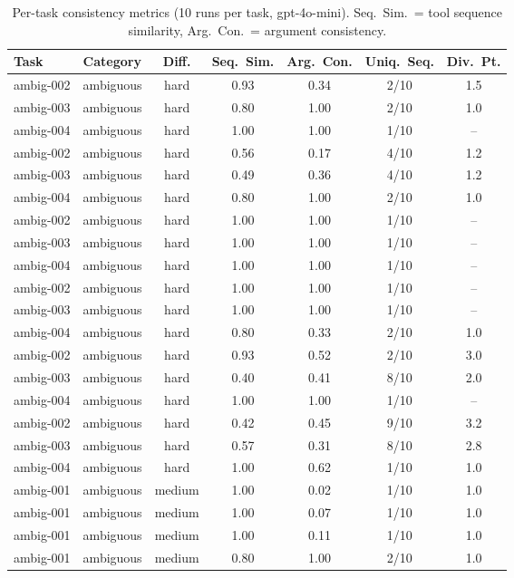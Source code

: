 \begin{table}[t]
\centering
\caption{Per-task consistency metrics (10 runs per task, gpt-4o-mini). Seq.\ Sim.\ = tool sequence similarity, Arg.\ Con.\ = argument consistency.}
\label{tab:results}
\small
\begin{tabular}{llccccc}
\toprule
Task & Category & Diff. & Seq.\ Sim. & Arg.\ Con. & Uniq.\ Seq. & Div.\ Pt. \\
\midrule
ambig-002 & ambiguous & hard & 0.93 & 0.34 & 2/10 & 1.5 \\
ambig-003 & ambiguous & hard & 0.80 & 1.00 & 2/10 & 1.0 \\
ambig-004 & ambiguous & hard & 1.00 & 1.00 & 1/10 & -- \\
ambig-002 & ambiguous & hard & 0.56 & 0.17 & 4/10 & 1.2 \\
ambig-003 & ambiguous & hard & 0.49 & 0.36 & 4/10 & 1.2 \\
ambig-004 & ambiguous & hard & 0.80 & 1.00 & 2/10 & 1.0 \\
ambig-002 & ambiguous & hard & 1.00 & 1.00 & 1/10 & -- \\
ambig-003 & ambiguous & hard & 1.00 & 1.00 & 1/10 & -- \\
ambig-004 & ambiguous & hard & 1.00 & 1.00 & 1/10 & -- \\
ambig-002 & ambiguous & hard & 1.00 & 1.00 & 1/10 & -- \\
ambig-003 & ambiguous & hard & 1.00 & 1.00 & 1/10 & -- \\
ambig-004 & ambiguous & hard & 0.80 & 0.33 & 2/10 & 1.0 \\
ambig-002 & ambiguous & hard & 0.93 & 0.52 & 2/10 & 3.0 \\
ambig-003 & ambiguous & hard & 0.40 & 0.41 & 8/10 & 2.0 \\
ambig-004 & ambiguous & hard & 1.00 & 1.00 & 1/10 & -- \\
ambig-002 & ambiguous & hard & 0.42 & 0.45 & 9/10 & 3.2 \\
ambig-003 & ambiguous & hard & 0.57 & 0.31 & 8/10 & 2.8 \\
ambig-004 & ambiguous & hard & 1.00 & 0.62 & 1/10 & 1.0 \\
ambig-001 & ambiguous & medium & 1.00 & 0.02 & 1/10 & 1.0 \\
ambig-001 & ambiguous & medium & 1.00 & 0.07 & 1/10 & 1.0 \\
ambig-001 & ambiguous & medium & 1.00 & 0.11 & 1/10 & 1.0 \\
ambig-001 & ambiguous & medium & 0.80 & 1.00 & 2/10 & 1.0 \\

\end{tabular}
\end{table}
